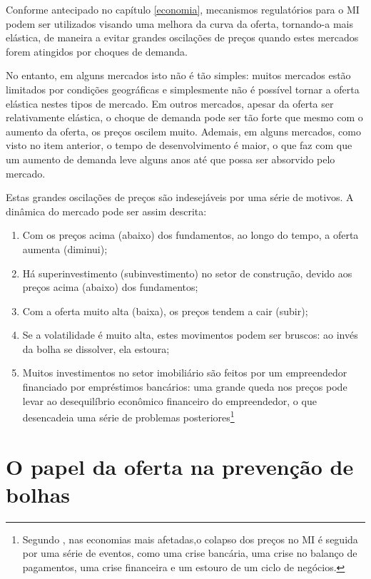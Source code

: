 \documentclass[
	12pt,				%
	oneside,			%
	a4paper,			%
	chapter=TITLE,		%
	section=TITLE,		%
	english,			%
	brazil				%
	]{abntex2}
\begin{document}
Conforme antecipado no capítulo \ref{economia}, mecanismos regulatórios para o
\gls{MI} podem ser utilizados visando uma melhora da curva da oferta, tornando-a
mais elástica, de maneira a evitar grandes oscilações de preços quando estes
mercados forem atingidos por choques de demanda.

No entanto, em alguns mercados isto não é tão simples: muitos mercados estão
limitados por condições geográficas e simplesmente não é possível tornar a
oferta elástica nestes tipos de mercado. Em outros mercados, apesar da oferta
ser relativamente elástica, o choque de demanda pode ser tão forte que mesmo com
o aumento da oferta, os preços oscilem muito. Ademais, em alguns mercados, como
visto no item anterior, o tempo de desenvolvimento é maior, o que faz com que
um aumento de demanda leve alguns anos até que possa ser absorvido pelo mercado.

Estas grandes oscilações de preços são indesejáveis por uma série de motivos.
A dinâmica do mercado pode ser assim descrita:
\begin{enumerate}
\def\labelenumi{\arabic{enumi}.}
\tightlist
\item
  Com os preços acima (abaixo) dos fundamentos, ao longo do tempo, a oferta
  aumenta (diminui);
\item
  Há superinvestimento (subinvestimento) no setor de construção, devido aos
  preços acima (abaixo) dos fundamentos;
\item
  Com a oferta muito alta (baixa), os preços tendem a cair (subir);
\item
  Se a volatilidade é muito alta, estes movimentos podem ser bruscos: ao invés
  da bolha se dissolver, ela estoura;
\item
  Muitos investimentos no setor imobiliário são feitos por um empreendedor
  financiado por empréstimos bancários: uma grande queda nos preços pode levar
  ao desequilíbrio econômico financeiro do empreendedor, o que desencadeia uma
  série de problemas posteriores\footnote{Segundo \textcite[p.~2]{Malpezzi2002TheRO}, nas economias mais afetadas,o colapso
    dos preços no \gls{MI} é seguida por uma série de eventos, como uma crise
    bancária, uma crise no balanço de pagamentos, uma crise financeira e um estouro
    de um ciclo de negócios.}
\end{enumerate}
\hypertarget{o-papel-da-oferta-na-prevenuxe7uxe3o-de-bolhas}{%
\section{O papel da oferta na prevenção de bolhas}\label{o-papel-da-oferta-na-prevenuxe7uxe3o-de-bolhas}}
\end{document}
